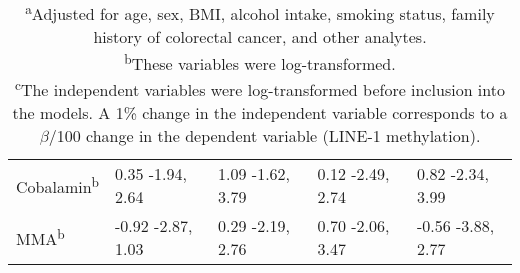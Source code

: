 \begin{sidewaystable}
\begin{adjustbox}{width=18cm}
\begin{tabular}{L{3cm}C{4.0cm}C{4.0cm}C{4.0cm}C{4.0cm}}
Cobalamin\textsuperscript{b} & { 0.35} {}-1.94, 2.64 & { 1.09} {}-1.62, 3.79 & { 0.12} {}-2.49, 2.74 & { 0.82} {}-2.34, 3.99\\

MMA\textsuperscript{b} & { {}-0.92} {}-2.87, 1.03 & { 0.29} {}-2.19, 2.76 & { 0.70} {}-2.06, 3.47 & { {}-0.56} {}-3.88, 2.77\\
\hline
\end{tabular}
\end{adjustbox}
\caption*{\footnotesize{\textsuperscript{a}Adjusted for age, sex, BMI, alcohol intake, smoking status, family history of colorectal cancer, and other analytes. \\ \textsuperscript{b}These variables were log-transformed. \\ \textsuperscript{c}The independent variables were log-transformed before inclusion into the models. A 1\% change in the independent variable corresponds to a $\beta$/100 change in the dependent variable (LINE-1 methylation).}}
\end{sidewaystable}

